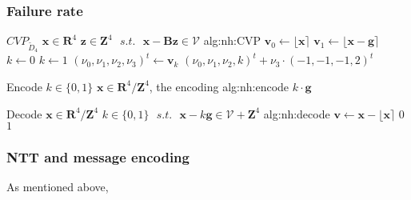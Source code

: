 \subsubsection{Failure rate}


\begin{b_algorithm}{$CVP_{\tilde{D}_4}$}
{$\textbf{x} \in \mathbf{R}^4$}
{$\textbf{z} \in \mathbf{Z}^4\text{ }s.t.\text{ }\textbf{x} - \textbf{Bz} \in \mathscr{V}$}
{alg:nh:CVP}
\STATE $\textbf{v}_0 \gets \lfloor\textbf{x}\rceil$
\STATE $\textbf{v}_1 \gets \lfloor\textbf{x}-\textbf{g}\rceil$
    \STATE $k \gets 0$
\ELSE
    \STATE $k \gets 1$
\ENDIF
\STATE $(\nu_0,\nu_1,\nu_2,\nu_3)^t \gets \textbf{v}_k$
\RETURN $(\nu_0,\nu_1,\nu_2,k)^t + \nu_3\cdot(-1,-1,-1,2)^t$
\end{b_algorithm}

\begin{b_algorithm}{Encode}
{$k \in \{0,1\}$}
{$\textbf{x} \in \mathbf{R}^4/\mathbf{Z}^4$, the encoding}
{alg:nh:encode}
\RETURN $k\cdot\textbf{g}$
\end{b_algorithm}

\begin{b_algorithm}{Decode}
{$\textbf{x} \in \mathbf{R}^4/\mathbf{Z}^4$}
{$k \in \{0,1\}\text{ }s.t.\text{ }\textbf{x} - k\textbf{g} \in \mathscr{V}+\mathbf{Z}^4$}
{alg:nh:decode}
\STATE $\textbf{v} \gets \mathbf{x} - \lfloor\mathbf{x}\rceil$
    \RETURN $0$
\ELSE
    \RETURN $1$
\ENDIF
\end{b_algorithm}

\subsubsection{NTT and message encoding}
As mentioned above, 

